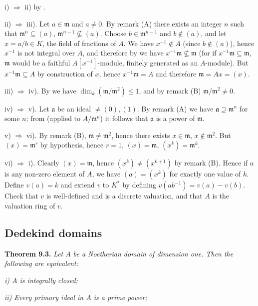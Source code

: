i) \(\Rightarrow\) ii) by .

ii) \(\Rightarrow\) iii). Let \(a\in\mathfrak m\) and \(a\neq0\). By remark (A) there exists an integer \(n\) such that \(\mathfrak m^n\subseteq(a)\), \(\mathfrak m^{n-1}\not\subseteq(a)\). Choose \(b\in\mathfrak m^{n-1}\) and \(b\notin(a)\), and let \(x=a/b\in K\), the field of fractions of \(A\). We have \(x^{-1}\notin A\) (since \(b\notin(a)\)), hence \(x^{-1}\) is not integral over \(A\), and therefore by  we have \(x^{-1}\mathfrak m\not\subseteq\mathfrak m\) (for if \(x^{-1}\mathfrak m\subseteq\mathfrak m\), \(\mathfrak m\) would be a faithful \(A[x^{-1}]\)-module, finitely generated as an \(A\)-module). But \(x^{-1}\mathfrak m\subseteq A\) by construction of \(x\), hence \(x^{-1}\mathfrak m=A\) and therefore \(\mathfrak m=Ax=(x)\).

iii) \(\Rightarrow\) iv). By  we have \(\dim_k(\mathfrak m/\mathfrak m^2)\leq1\), and by remark (B) \(\mathfrak m/\mathfrak m^2\neq0\).

iv) \(\Rightarrow\) v). Let \(\mathfrak a\) be an ideal \(\neq(0),(1)\). By remark (A) we have \(\mathfrak a\supseteq\mathfrak m^n\) for some \(n\); from  (applied to \(A/\mathfrak m^n\)) it follows that \(\mathfrak a\) is a power of \(\mathfrak m\).

v) \(\Rightarrow\) vi). By remark (B), \(\mathfrak m\neq\mathfrak m^2\), hence there exists \(x\in\mathfrak m\), \(x\notin\mathfrak m^2\). But \((x)=\mathfrak m^r\) by hypothesis, hence \(r=1\), \((x)=\mathfrak m\), \((x^k)=\mathfrak m^k\).

vi) \(\Rightarrow\) i). Clearly \((x)=\mathfrak m\), hence \((x^k)\neq(x^{k+1})\) by remark (B). Hence if \(a\) is any non-zero element of \(A\), we have \((a)=(x^k)\) for exactly one value of \(k\). Define \(v(a)=k\) and extend \(v\) to \(K^*\) by defining \(v(ab^{-1})=v(a)-v(b)\). Check that \(v\) is well-defined and is a discrete valuation, and that \(A\) is the valuation ring of \(v\). \proofbox

\subsection{Dedekind domains}

\noindent\textbf{Theorem 9.3.} \emph{Let \(A\) be a Noetherian domain of dimension one. Then the following are equivalent:}

\emph{i) \(A\) is integrally closed;}

\emph{ii) Every primary ideal in \(A\) is a prime power;}

